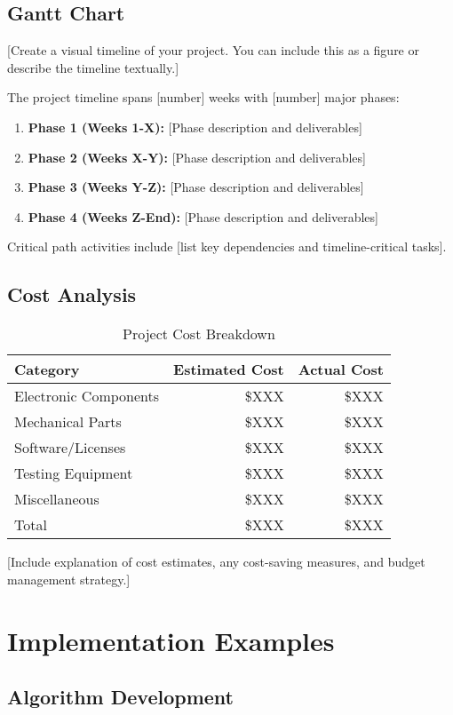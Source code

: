 \documentclass[final]{../designreport}
\newcommand{\ganttchart}{\subsection{Gantt Chart}}
\newcommand{\costanalysis}{\subsection{Cost Analysis}}
\begin{document}
\ganttchart
[Create a visual timeline of your project. You can include this as a figure or describe the timeline textually.]

The project timeline spans [number] weeks with [number] major phases:

\begin{enumerate}
    \item \textbf{Phase 1 (Weeks 1-X):} [Phase description and deliverables]
    \item \textbf{Phase 2 (Weeks X-Y):} [Phase description and deliverables]
    \item \textbf{Phase 3 (Weeks Y-Z):} [Phase description and deliverables]
    \item \textbf{Phase 4 (Weeks Z-End):} [Phase description and deliverables]
\end{enumerate}

Critical path activities include [list key dependencies and timeline-critical tasks].

\costanalysis

\begin{table}[htbp]
\centering
\caption{Project Cost Breakdown}
\begin{tabular}{@{}lrr@{}}
\toprule
Category & Estimated Cost & Actual Cost \\
\midrule
Electronic Components & \$XXX & \$XXX \\
Mechanical Parts & \$XXX & \$XXX \\
Software/Licenses & \$XXX & \$XXX \\
Testing Equipment & \$XXX & \$XXX \\
Miscellaneous & \$XXX & \$XXX \\
\midrule
Total & \$XXX & \$XXX \\
\bottomrule
\end{tabular}
\end{table}

[Include explanation of cost estimates, any cost-saving measures, and budget management strategy.]

\section{Implementation Examples}

\subsection{Algorithm Development}
\end{document}
